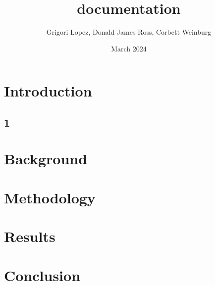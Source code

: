 \documentclass{article}
\title{documentation}
\author{Grigori Lopez, Donald James Ross, Corbett Weinburg}
\date{March 2024}
\begin{document}
\maketitle

\section{Introduction}
\subsection{1}


\section{Background}

\section{Methodology}

\section{Results}

\section{Conclusion}
\end{document}

